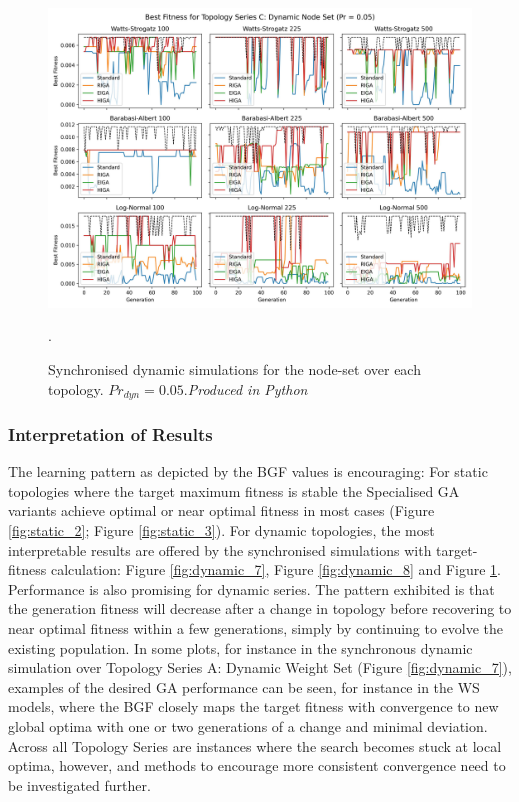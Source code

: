 \documentclass[
	a4paper, %
	10pt, %
	unnumberedsections, %
	twoside, %
]{LTJournalArticle}
\begin{document}
 \begin{figure}
	\includegraphics[width=\linewidth]{Figures/sims/dynamic/series_c_node_sync.jpg}
	\caption{Synchronised dynamic simulations for the node-set over each topology. \(Pr_{dyn} = 0.05\).\emph{Produced in Python}}. 
	\label{fig:dynamic_9}
\end{figure}

\subsubsection{Interpretation of Results} The learning pattern as depicted by the BGF values is encouraging: For static topologies where the target maximum fitness is stable the Specialised GA variants achieve optimal or near optimal fitness in most cases (Figure \ref{fig:static_2}; Figure \ref{fig:static_3}). For dynamic topologies, the most interpretable results are offered by the synchronised simulations with target-fitness calculation: Figure \ref{fig:dynamic_7}, Figure \ref{fig:dynamic_8} and Figure \ref{fig:dynamic_9}. Performance is also promising for dynamic series. The pattern exhibited is that the generation fitness will decrease after a change in topology before recovering to near optimal fitness within a few generations, simply by continuing to evolve the existing population. In some plots, for instance in the synchronous dynamic simulation over Topology Series A: Dynamic Weight Set (Figure \ref{fig:dynamic_7}), examples of the desired GA performance can be seen, for instance in the WS models, where the BGF closely maps the target fitness with convergence to new global optima with one or two generations of a change and minimal deviation. Across all Topology Series are instances where the search becomes stuck at local optima, however, and methods to encourage more consistent convergence need to be investigated further. \\
\end{document}
